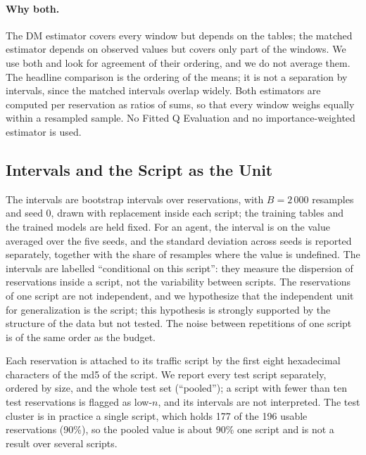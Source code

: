 \paragraph{Why both.}
The DM estimator covers every window but depends on the tables; the matched estimator depends on observed values but covers only part of the windows.%
We use both and look for agreement of their ordering, and we do not average them.%
The headline comparison is the ordering of the means; it is not a separation by intervals, since the matched intervals overlap widely.%
Both estimators are computed per reservation as ratios of sums, so that every window weighs equally within a resampled sample.%
No Fitted Q Evaluation and no importance-weighted estimator is used.%

\subsection{Intervals and the Script as the Unit}
\label{sec:intervals}

The intervals are bootstrap intervals over reservations, with $B=2\,000$ resamples and seed 0, drawn with replacement inside each script; the training tables and the trained models are held fixed.%
For an agent, the interval is on the value averaged over the five seeds, and the standard deviation across seeds is reported separately, together with the share of resamples where the value is undefined.%
The intervals are labelled ``conditional on this script'': they measure the dispersion of reservations inside a script, not the variability between scripts.%
The reservations of one script are not independent, and we hypothesize that the independent unit for generalization is the script; this hypothesis is strongly supported by the structure of the data but not tested.%
The noise between repetitions of one script is of the same order as the budget.%

Each reservation is attached to its traffic script by the first eight hexadecimal characters of the md5 of the script.%
We report every test script separately, ordered by size, and the whole test set (``pooled''); a script with fewer than ten test reservations is flagged as low-$n$, and its intervals are not interpreted.%
The test cluster is in practice a single script, which holds 177 of the 196 usable reservations (90\%), so the pooled value is about 90\% one script and is not a result over several scripts.%

